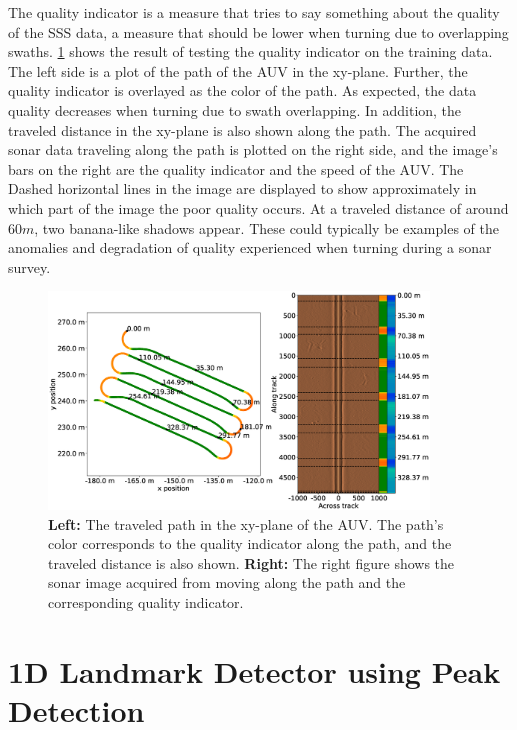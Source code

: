 The quality indicator is a measure that tries to say something about the quality of the SSS data, a measure that should be lower when turning due to overlapping swaths. \cref{fig:path_and_quality_ind} shows the result of testing the quality indicator on the training data. The left side is a plot of the path of the AUV in the xy-plane. Further, the quality indicator is overlayed as the color of the path. As expected, the data quality decreases when turning due to swath overlapping. In addition, the traveled distance in the xy-plane is also shown along the path. The acquired sonar data traveling along the path is plotted on the right side, and the image's bars on the right are the quality indicator and the speed of the AUV. The Dashed horizontal lines in the image are displayed to show approximately in which part of the image the poor quality occurs. At a traveled distance of around $60 m$, two banana-like shadows appear. These could typically be examples of the anomalies and degradation of quality experienced when turning during a sonar survey. 

\begin{figure} %
  \centering
  \includegraphics[trim=0cm 2cm 5.5cm 3cm, clip=true, width=0.9\textwidth]{figures/path_and_quality_indicator.eps}
  \caption[Path with quality indicator overlayed]{\textbf{Left:} The traveled path in the xy-plane of the AUV. The path's color corresponds to the quality indicator along the path, and the traveled distance is also shown. \textbf{Right:} The right figure shows the sonar image acquired from moving along the path and the corresponding quality indicator.}
  \label{fig:path_and_quality_ind}
\end{figure}

\section{1D Landmark Detector using Peak Detection}

